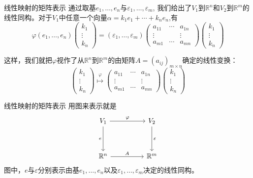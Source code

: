 
\begin{frame}

\begin{block}{线性映射的矩阵表示}
通过取基$e_1, \ldots, e_n$与$\varepsilon_1, \ldots, \varepsilon_m$, 我们给出了$V_1$到$\mathbb{R}^n$和$V_2$到$\mathbb{R}^m$的线性同构。对于$V_1$中任意一个向量$\alpha = k_1e_1 + \cdots + k_ne_n$,有
\[\varphi(e_1, \ldots, e_n) \begin{pmatrix} k_1 \\ \vdots \\ k_n \end{pmatrix} = (\varepsilon_1, \ldots, \varepsilon_m) \begin{pmatrix}
a_{11} & \cdots & a_{1n} \\ \vdots & & \vdots \\ a_{m1} & \cdots & a_{mn} \end{pmatrix} \begin{pmatrix} k_1 \\ \vdots \\ k_n \end{pmatrix}\]

\pause

这样，我们就把$\varphi$视作了从$\mathbb{R}^n$到$\mathbb{R}^m$的由矩阵$A = (a_{ij})_{m\times n}$确定的线性变换：
\[\begin{pmatrix} k_1 \\ \vdots \\ k_n \end{pmatrix} \overset{\varphi}{\mapsto} \begin{pmatrix}
a_{11} & \cdots & a_{1n} \\ \vdots & & \vdots \\ a_{m1} & \cdots & a_{mn} \end{pmatrix} \begin{pmatrix} k_1 \\ \vdots \\ k_n \end{pmatrix}\]
\end{block}

\end{frame}


\begin{frame}[fragile]

\begin{block}{线性映射的矩阵表示}
用图来表示就是
\[
\begin{tikzcd}[column sep = huge, row sep = huge]
V_1 \ar[r, "\varphi"] \ar[d, "e"'] & V_2 \ar[d, "\varepsilon"] \\
\mathbb{R}^n \ar[r, "A"] & \mathbb{R}^m
\end{tikzcd}
\]
图中，$e$与$\varepsilon$分别表示由基$e_1, \ldots, e_n$以及$\varepsilon_1, \ldots, \varepsilon_m$决定的线性同构。
\end{block}

\end{frame}

